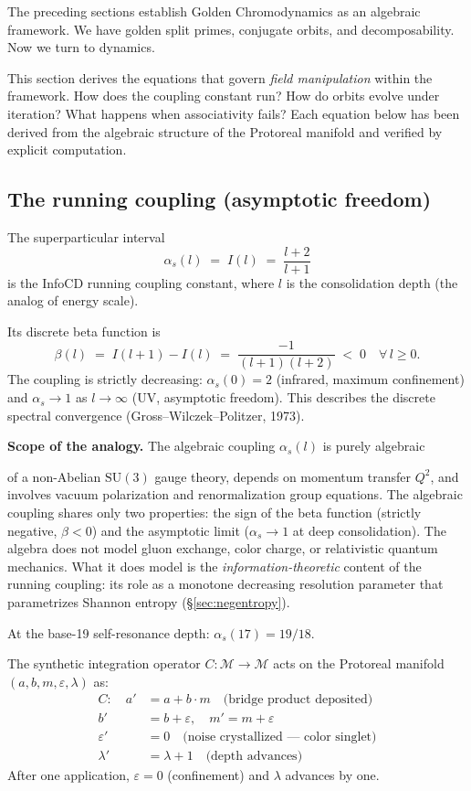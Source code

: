 The preceding sections establish Golden Chromodynamics as an algebraic framework. We have golden split primes, conjugate orbits, and decomposability. Now we turn to dynamics.

This section derives the equations that govern \emph{field manipulation} within the framework. How does the coupling constant run? How do orbits evolve under iteration? What happens when associativity fails? Each equation below has been derived from the algebraic structure of the Protoreal manifold and verified by explicit computation.

\subsection{The running coupling (asymptotic freedom)}

The superparticular interval
\[
\alpha_s(l) \;=\; I(l) \;=\; \frac{l + 2}{l + 1}
\]
is the InfoCD running coupling constant, where $l$ is the
consolidation depth (the analog of energy scale).

Its discrete beta function is
\[
\beta(l) \;=\; I(l+1) - I(l) \;=\; \frac{-1}{(l+1)(l+2)} \;<\; 0
\quad \forall\, l \geq 0.
\]
The coupling is strictly decreasing: $\alpha_s(0) = 2$ (infrared,
maximum confinement) and $\alpha_s \to 1$ as $l \to \infty$ (UV,
asymptotic freedom). This describes the discrete spectral convergence
(Gross--Wilczek--Politzer, 1973).

\textbf{Scope of the analogy.} The algebraic coupling $\alpha_s(l)$
is purely algebraic

of a non-Abelian $\mathrm{SU}(3)$ gauge theory, depends on momentum
transfer $Q^2$, and involves vacuum polarization and renormalization
group equations. The algebraic coupling shares only two properties:
the sign of the beta function (strictly negative, $\beta < 0$) and
the asymptotic limit ($\alpha_s \to 1$ at deep consolidation). The
algebra does not model gluon exchange, color charge, or relativistic
quantum mechanics. What it does model is the \emph{information-theoretic}
content of the running coupling: its role as a monotone decreasing
resolution parameter that parametrizes Shannon entropy
(\S\ref{sec:negentropy}).

At the base-19 self-resonance depth: $\alpha_s(17) = 19/18$.

The synthetic integration operator $C : \mathcal{M} \to \mathcal{M}$
acts on the Protoreal manifold $(a, b, m, \varepsilon, \lambda)$ as:
\begin{align}
C: \quad
a' &= a + b \cdot m \quad \text{(bridge product deposited)} \\
b' &= b + \varepsilon, \quad m' = m + \varepsilon \\
\varepsilon' &= 0 \quad \text{(noise crystallized --- color singlet)} \\
\lambda' &= \lambda + 1 \quad \text{(depth advances)}
\end{align}
After one application, $\varepsilon = 0$ (confinement) and
$\lambda$ advances by one.

